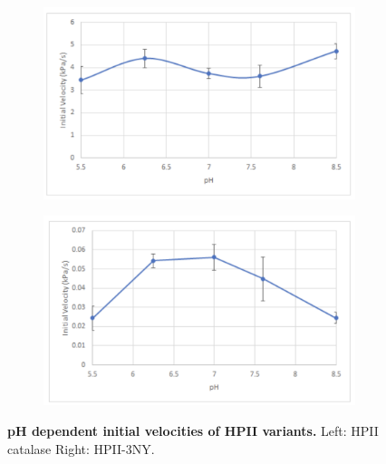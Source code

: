 \documentclass[journal=jacsat,manuscript=article]{achemso}
\begin{document}
\begin{figure}[h!]
  \centering
  \begin{subfigure}{\textwidth}
    \begin{minipage}{0.1\textwidth}\caption{}\end{minipage}%
    \begin{minipage}{0.9\textwidth}\includegraphics[width=0.9\linewidth]{figures/wildtype-velocity.png}\end{minipage}
  \end{subfigure}
  \begin{subfigure}{\textwidth}
    \begin{minipage}{0.1\textwidth}\caption{}\end{minipage}%
    \begin{minipage}{0.9\textwidth}\includegraphics[width=0.9\linewidth]{figures/3ny-velocity.png}\end{minipage}
  \end{subfigure}
  \caption{\textbf{pH dependent initial velocities of HPII variants.} Left: HPII catalase Right: HPII-3NY.}
\label{fig:ph-dependent-velocities}
\end{figure}
\end{document}
